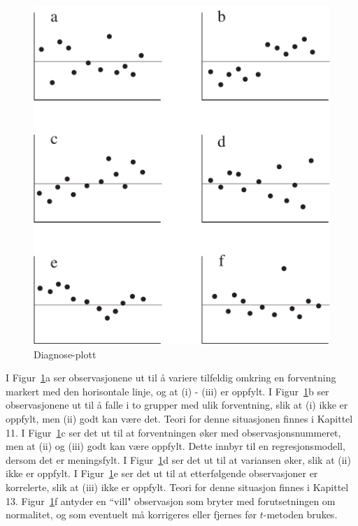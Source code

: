 \begin{figure}[H]
\centering
	 \includegraphics[scale=0.8]{figurer/fig8_8.pdf} 
 \caption{Diagnose-plott}
	\label{fig:diagnoseplott}
\end{figure}
I Figur~\ref{fig:diagnoseplott}a ser observasjonene ut til å variere tilfeldig
omkring en forventning markert med den  horisontale linje, og at
(i) - (iii) er oppfylt. I Figur~\ref{fig:diagnoseplott}b ser observasjonene ut til
å falle i to grupper med ulik forventning, slik at (i) ikke
er oppfylt, men (ii) godt kan være det. Teori for denne
situasjonen finnes i Kapittel 11. I Figur~\ref{fig:diagnoseplott}c ser det ut til at
forventningen øker med observasjonsnummeret, men at (ii) og
(iii) godt kan være oppfylt. Dette innbyr til en
regresjonsmodell, dersom det er meningsfylt. I Figur~\ref{fig:diagnoseplott}d ser det
ut til at variansen øker, slik at (ii) ikke er oppfylt. I
Figur~\ref{fig:diagnoseplott}e ser det ut til at etterfølgende observasjoner er
korrelerte, slik at (iii) ikke er oppfylt. Teori for denne
situasjon finnes i Kapittel 13. Figur~\ref{fig:diagnoseplott}f antyder en ``vill"
observasjon som bryter med forutsetningen om normalitet, og som
eventuelt må korrigeres eller fjernes før $t$-metoden
brukes.

